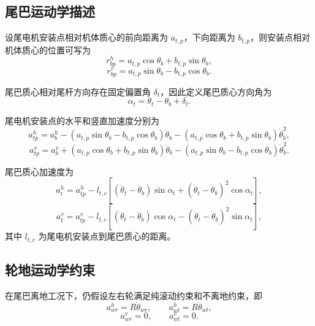 \documentclass[UTF8,a4paper,12pt]{ctexart}
\begin{document}
\subsection{尾巴运动学描述}

设尾电机安装点相对机体质心的前向距离为 $a_{t,p}$，下向距离为 $b_{t,p}$，则安装点相对机体质心的位置可写为
\begin{equation}
    r_{bp}^h = a_{t,p}\cos\theta_b + b_{t,p}\sin\theta_b,
\end{equation}
\begin{equation}
    r_{bp}^v = a_{t,p}\sin\theta_b - b_{t,p}\cos\theta_b.
\end{equation}

尾巴质心相对尾杆方向存在固定偏置角 $\delta_t$，因此定义尾巴质心方向角为
\begin{equation}
    \alpha_t = \theta_t - \theta_b + \delta_t.
\end{equation}

尾电机安装点的水平和竖直加速度分别为
\begin{equation}
    a_{tp}^h =
    a_b^h
    - \left(a_{t,p}\sin\theta_b - b_{t,p}\cos\theta_b\right)\ddot\theta_b
    - \left(a_{t,p}\cos\theta_b + b_{t,p}\sin\theta_b\right)\dot\theta_b^2,
\end{equation}
\begin{equation}
    a_{tp}^v =
    a_b^v
    + \left(a_{t,p}\cos\theta_b + b_{t,p}\sin\theta_b\right)\ddot\theta_b
    - \left(a_{t,p}\sin\theta_b - b_{t,p}\cos\theta_b\right)\dot\theta_b^2.
\end{equation}

尾巴质心加速度为
\begin{equation}
    a_t^h =
    a_{tp}^h
    - l_{t,c}
    \left[
        \left(\ddot\theta_t - \ddot\theta_b\right)\sin\alpha_t
        +
        \left(\dot\theta_t - \dot\theta_b\right)^2\cos\alpha_t
    \right],
\end{equation}
\begin{equation}
    a_t^v =
    a_{tp}^v
    - l_{t,c}
    \left[
        \left(\ddot\theta_t - \ddot\theta_b\right)\cos\alpha_t
        -
        \left(\dot\theta_t - \dot\theta_b\right)^2\sin\alpha_t
    \right],
\end{equation}
其中 $l_{t,c}$ 为尾电机安装点到尾巴质心的距离。

\subsection{轮地运动学约束}

在尾巴离地工况下，仍假设左右轮满足纯滚动约束和不离地约束，即
\begin{equation}
    a_{wr}^h = R\ddot\theta_{wr}, \qquad
    a_{wl}^h = R\ddot\theta_{wl},
\end{equation}
\begin{equation}
    a_{wr}^v = 0, \qquad a_{wl}^v = 0.
\end{equation}
\end{document}
